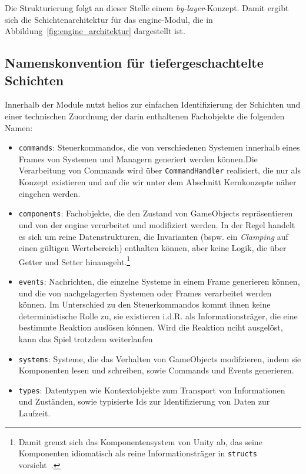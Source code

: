 Die Strukturierung folgt an dieser Stelle einem \textit{by-layer}-Konzept.
Damit ergibt sich die Schichtenarchitektur für das engine-Modul, die in Abbildung~\ref{fig:engine_architektur} dargestellt ist.

\subsection{Namenskonvention für tiefergeschachtelte Schichten}
Innerhalb der Module nutzt helios zur einfachen Identifizierung der Schichten und einer technischen Zuordnung der darin enthaltenen Fachobjekte die folgenden Namen:

\begin{itemize}
    \itemsep0.5em
    \item \texttt{commands}: Steuerkommandos, die von verschiedenen Systemen innerhalb eines Frames von Systemen und Managern generiert werden können.Die Verarbeitung von Commands wird über \texttt{CommandHandler} realisiert, die nur als Konzept existieren und auf die wir unter dem Abschnitt Kernkonzepte näher eingehen werden.
    \item \texttt{components}: Fachobjekte, die den Zustand von GameObjects repräsentieren und von der engine verarbeitet und modifiziert werden. In der Regel handelt es sich um reine Datenstrukturen, die Invarianten (bspw. ein \textit{Clamping} auf einen gültigen Wertebereich) enthalten können, aber keine Logik, die über Getter und Setter hinausgeht.\footnote{
    Damit grenzt sich das Komponentensystem von Unity ab, das seine Komponenten idiomatisch als reine Informationsträger in \texttt{structs} vorsieht~\cite{UnityComponentConcepts}.
    }
    \item \texttt{events}: Nachrichten, die einzelne Systeme in einem Frame generieren können, und die von nachgelagerten Systemen oder Frames verarbeitet werden können. Im Unterschied zu den Steuerkommandos kommt ihnen keine deterministische Rolle zu, sie existieren i.d.R. als Informationsträger, die eine bestimmte Reaktion auslösen können. Wird die Reaktion nciht ausgelöst, kann das Spiel trotzdem weiterlaufen
    \item \texttt{systems}: Systeme, die das Verhalten von GameObjects modifzieren, indem sie Komponenten lesen und schreiben, sowie Commands und Events generieren.
    \item \texttt{types}: Datentypen wie Kontextobjekte zum Transport von Informationen und Zuständen, sowie typisierte Ids zur Identifizierung von Daten zur Laufzeit.
\end{itemize}


